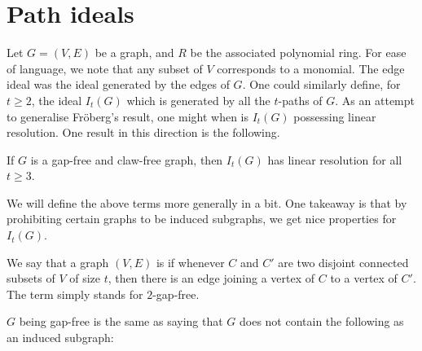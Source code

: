 \documentclass[12pt]{article}
\begin{document}
\section{Path ideals}

Let $G = (V, E)$ be a graph, and $R$ be the associated polynomial ring. For ease of language, we note that any subset of $V$ corresponds to a monomial. The edge ideal was the ideal generated by the edges of $G$. One could similarly define, for $t \ge 2$, the ideal $I_{t}(G)$ which is generated by all the $t$-paths of $G$. \newline
As an attempt to generalise Fr\"{o}berg's result, one might when is $I_{t}(G)$ possessing linear resolution. One result in this direction is the following.

\begin{thm}
	If $G$ is a gap-free and claw-free graph, then $I_{t}(G)$ has linear resolution for all $t \ge 3$.
\end{thm}

We will define the above terms more generally in a bit. One takeaway is that by prohibiting certain graphs to be induced subgraphs, we get nice properties for $I_{t}(G)$.

\begin{defn}
	We say that a graph $(V, E)$ is  if whenever $C$ and $C'$ are two disjoint connected subsets of $V$ of size $t$, then there is an edge joining a vertex of $C$ to a vertex of $C'$. \newline
	The term  simply stands for $2$-gap-free.
\end{defn}

\begin{rem}
	$G$ being gap-free is the same as saying that $G$ does not contain the following as an induced subgraph:

\end{rem}
\end{document}
